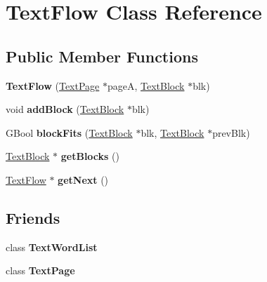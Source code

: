 \hypertarget{class_text_flow}{}\section{Text\+Flow Class Reference}
\label{class_text_flow}
\subsection*{Public Member Functions}
\begin{DoxyCompactItemize}
\item 
\mbox{\label{class_text_flow_a20ed6ee4fbe0a07b7fa06902075fcdcd}} 
{\bfseries Text\+Flow} (\hyperlink{class_text_page}{Text\+Page} $\ast$pageA, \hyperlink{class_text_block}{Text\+Block} $\ast$blk)
\item 
\mbox{\label{class_text_flow_ad33d345f0becb37c2cde296308e06335}} 
void {\bfseries add\+Block} (\hyperlink{class_text_block}{Text\+Block} $\ast$blk)
\item 
\mbox{\label{class_text_flow_a85bc5812a70f1a77b1bf801aeae64e62}} 
G\+Bool {\bfseries block\+Fits} (\hyperlink{class_text_block}{Text\+Block} $\ast$blk, \hyperlink{class_text_block}{Text\+Block} $\ast$prev\+Blk)
\item 
\mbox{\label{class_text_flow_a7be0b5b4af4cb278c87abe85cea5bca0}} 
\hyperlink{class_text_block}{Text\+Block} $\ast$ {\bfseries get\+Blocks} ()
\item 
\mbox{\label{class_text_flow_a08ad133e0841e0444e7b022e080425d0}} 
\hyperlink{class_text_flow}{Text\+Flow} $\ast$ {\bfseries get\+Next} ()
\end{DoxyCompactItemize}
\subsection*{Friends}
\begin{DoxyCompactItemize}
\item 
\mbox{\label{class_text_flow_ab6d080596abe41783ce85827de349c49}} 
class {\bfseries Text\+Word\+List}
\item 
\mbox{\label{class_text_flow_aabfaf949a35dc7fec076efc8f20054a8}} 
class {\bfseries Text\+Page}
\end{DoxyCompactItemize}


